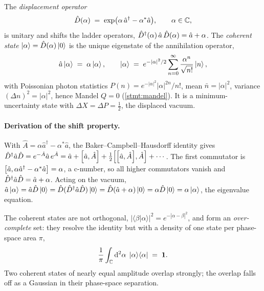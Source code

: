 \begin{statement}
\label{stmt:coherent}
The \emph{displacement operator}
\begin{equation}
\label{eq:displacement}
\hat{D}(\alpha) \;=\; \exp\bigl(\alpha\,\hat a^\dagger - \alpha^*\hat a\bigr),
\qquad \alpha\in\mathbb{C},
\end{equation}
is unitary and shifts the ladder operators,
$\hat{D}^\dagger(\alpha)\,\hat a\,\hat{D}(\alpha)=\hat a+\alpha$. The
\emph{coherent state} $\ket\alpha=\hat{D}(\alpha)\ket0$ is the unique
eigenstate of the annihilation operator,
\begin{equation}
\label{eq:coherent-eigenstate}
\hat a\ket\alpha \;=\; \alpha\ket\alpha,
\qquad
\ket\alpha \;=\; e^{-|\alpha|^2/2}\sum_{n=0}^\infty\frac{\alpha^n}{\sqrt{n!}}\ket n,
\end{equation}
with Poissonian photon statistics
$P(n)=e^{-|\alpha|^2}|\alpha|^{2n}/n!$, mean $\bar n=|\alpha|^2$,
variance $(\Delta n)^2=|\alpha|^2$, hence Mandel $Q=0$
(\cref{stmt:mandel}). It is a minimum-uncertainty state with
$\Delta X=\Delta P=\tfrac12$, the displaced vacuum.
\end{statement}

\paragraph{Derivation of the shift property.}
With $\hat A=\alpha\hat a^\dagger-\alpha^*\hat a$, the
Baker--Campbell--Hausdorff identity gives
$\op D^\dagger\hat a\op D=e^{-\hat A}\hat a\,e^{\hat A}
=\hat a+\comm{\hat a}{\hat A}+\tfrac12\comm{\comm{\hat a}{\hat A}}{\hat A}+\cdots$.
The first commutator is
$\comm{\hat a}{\alpha\hat a^\dagger-\alpha^*\hat a}=\alpha$, a
c-number, so all higher commutators vanish and
$\hat{D}^\dagger\hat a\hat{D}=\hat a+\alpha$. Acting on the vacuum,
$\hat a\ket\alpha=\hat a\hat{D}\ket0=\hat{D}(\hat{D}^\dagger\hat a\hat{D})\ket0=\hat{D}(\hat a+\alpha)\ket0=\alpha\hat{D}\ket0=\alpha\ket\alpha$,
the eigenvalue equation.

\begin{statement}
\label{stmt:overcomplete}
The coherent states are not orthogonal,
$|\langle\beta|\alpha\rangle|^2=e^{-|\alpha-\beta|^2}$, and form an
\emph{over-complete} set: they resolve the identity but with a
density of one state per phase-space area $\pi$,
\begin{equation}
\label{eq:coherent-resolution}
\frac{1}{\pi}\int_{\mathbb{C}} \dd^2\alpha\;\ket\alpha\!\bra\alpha \;=\; \mathbf{1}.
\end{equation}
Two coherent states of nearly equal amplitude overlap strongly; the
overlap falls off as a Gaussian in their phase-space separation.
\end{statement}

